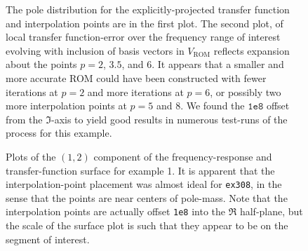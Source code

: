 \begin{table}
\caption{\label{tab:308test1} The 10 Ritz-poles of lowest relative-residual for each cycle. }
\end{table}

\clearpage
\begin{figure}
\centering
{}
\caption{\label{fig:308test1_tfunc} The pole distribution for the explicitly-projected transfer function and interpolation points are in the first plot.  The second plot, of local transfer function-error over the frequency range of interest  evolving with inclusion of basis vectors in $V_\text{ROM}$ reflects expansion about the points $p=2$, $3.5$, and $6$.   It appears that a smaller and more accurate ROM could have been constructed with fewer iterations at $p=2$ and more iterations at $p=6$, or possibly two more interpolation points at $p=5$ and $8$. We found the $\texttt{1e8}$ offset from the $\Im$-axis to yield good results in numerous test-runs of the process for this example.  }
\end{figure}

\begin{figure}
\centering
{}
\caption{\label{fig:308test1_tfunc} Plots of the $(1,2)$ component of the frequency-response and transfer-function surface for example 1.  It is apparent that the interpolation-point placement was almost ideal for \texttt{ex308}, in the sense that the points are near centers of pole-mass.   Note that the interpolation points are actually offset \texttt{1e8} into the $\Re$ half-plane, but the scale of the surface plot is such that they appear to be on the segment of interest.    }
\end{figure}



